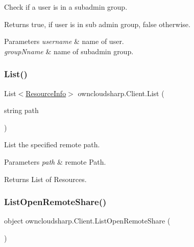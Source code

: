 Check if a user is in a subadmin group. 

\begin{DoxyReturn}{Returns}
{\ttfamily true}, if user is in sub admin group, {\ttfamily false} otherwise.
\end{DoxyReturn}

\begin{DoxyParams}{Parameters}
{\em username} & name of user.\\
\hline
{\em group\+Nname} & name of subadmin group.\\
\hline
\end{DoxyParams}
\mbox{\label{classowncloudsharp_1_1_client_a914c144ebbe207958829523f7eda3609}} 
\subsubsection{\texorpdfstring{List()}{List()}}
{\footnotesize\ttfamily List$<$\hyperlink{classowncloudsharp_1_1_types_1_1_resource_info}{Resource\+Info}$>$ owncloudsharp.\+Client.\+List (\begin{DoxyParamCaption}\item[{string}]{path }\end{DoxyParamCaption})}



List the specified remote path. 


\begin{DoxyParams}{Parameters}
{\em path} & remote Path.\\
\hline
\end{DoxyParams}
\begin{DoxyReturn}{Returns}
List of Resources.
\end{DoxyReturn}
\mbox{\label{classowncloudsharp_1_1_client_a47f02b74f8beb72a312ff92a07636096}} 
\subsubsection{\texorpdfstring{List\+Open\+Remote\+Share()}{ListOpenRemoteShare()}}
{\footnotesize\ttfamily object owncloudsharp.\+Client.\+List\+Open\+Remote\+Share (\begin{DoxyParamCaption}{ }\end{DoxyParamCaption})}



